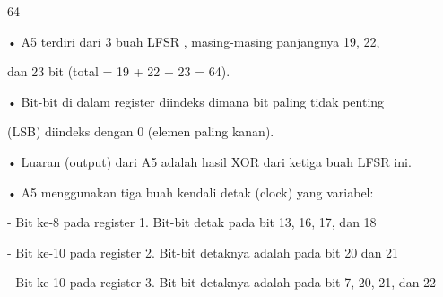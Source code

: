 \documentclass{article}
\begin{document}

64

• A5 terdiri dari 3 buah LFSR , masing-masing panjangnya 19, 22, 

dan 23 bit (total = 19 + 22 + 23 = 64). 

• Bit-bit di dalam register diindeks dimana bit paling tidak penting 

(LSB) diindeks dengan 0 (elemen paling kanan). 

• Luaran (output) dari A5 adalah hasil XOR dari ketiga buah LFSR ini. 

• A5 menggunakan tiga buah kendali detak (clock) yang variabel:  

  - Bit ke-8 pada register 1. Bit-bit detak pada bit 13, 16, 17, dan 18

 - Bit ke-10 pada register 2. Bit-bit detaknya adalah pada bit 20 dan 21

 - Bit ke-10 pada register 3. Bit-bit detaknya adalah pada bit 7, 20, 21, dan 22
\end{document}
